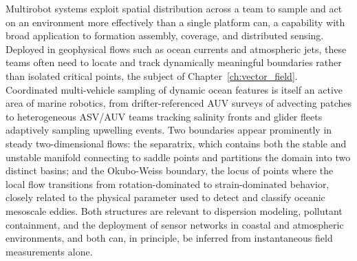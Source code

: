 \documentclass[12pt, letterpaper, oneside]{report}
\begin{document}
Multirobot systems exploit spatial distribution across a team to sample and
act on an environment more effectively than a single platform can, a
capability with broad application to formation assembly, coverage, and
distributed sensing. Deployed in geophysical flows such as ocean currents
and atmospheric jets, these teams often need to locate and track
dynamically meaningful boundaries rather than isolated critical points, the
subject of Chapter~\ref{ch:vector_field}. Coordinated multi-vehicle
sampling of dynamic ocean features is itself an active area of marine
robotics, from drifter-referenced AUV surveys of advecting patches to
heterogeneous ASV/AUV teams tracking salinity fronts and glider fleets
adaptively sampling upwelling events. Two boundaries appear prominently in
steady two-dimensional flows: the separatrix, which contains both the
stable and unstable manifold connecting to saddle points and partitions the
domain into two distinct basins; and the Okubo-Weiss boundary, the locus of
points where the local flow transitions from rotation-dominated to
strain-dominated behavior, closely related to the physical parameter used
to detect and classify oceanic mesoscale eddies. Both structures are
relevant to dispersion modeling, pollutant containment, and the deployment
of sensor networks in coastal and atmospheric environments, and both can,
in principle, be inferred from instantaneous field measurements alone.
\end{document}
